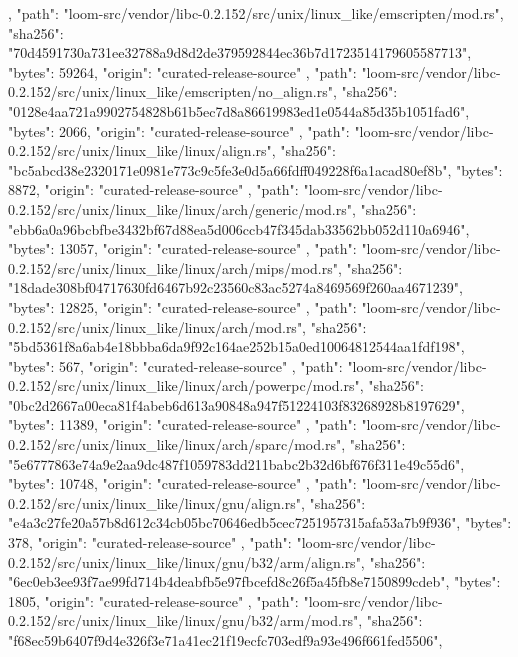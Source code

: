 {{    },
    {
      "path": "loom-src/vendor/libc-0.2.152/src/unix/linux_like/emscripten/mod.rs",
      "sha256": "70d4591730a731ee32788a9d8d2de379592844ec36b7d1723514179605587713",
      "bytes": 59264,
      "origin": "curated-release-source"
    },
    {
      "path": "loom-src/vendor/libc-0.2.152/src/unix/linux_like/emscripten/no_align.rs",
      "sha256": "0128e4aa721a9902754828b61b5ec7d8a86619983ed1e0544a85d35b1051fad6",
      "bytes": 2066,
      "origin": "curated-release-source"
    },
    {
      "path": "loom-src/vendor/libc-0.2.152/src/unix/linux_like/linux/align.rs",
      "sha256": "bc5abcd38e2320171e0981e773c9c5fe3e0d5a66fdff049228f6a1acad80ef8b",
      "bytes": 8872,
      "origin": "curated-release-source"
    },
    {
      "path": "loom-src/vendor/libc-0.2.152/src/unix/linux_like/linux/arch/generic/mod.rs",
      "sha256": "ebb6a0a96bcbfbe3432bf67d88ea5d006ccb47f345dab33562bb052d110a6946",
      "bytes": 13057,
      "origin": "curated-release-source"
    },
    {
      "path": "loom-src/vendor/libc-0.2.152/src/unix/linux_like/linux/arch/mips/mod.rs",
      "sha256": "18dade308bf04717630fd6467b92c23560c83ac5274a8469569f260aa4671239",
      "bytes": 12825,
      "origin": "curated-release-source"
    },
    {
      "path": "loom-src/vendor/libc-0.2.152/src/unix/linux_like/linux/arch/mod.rs",
      "sha256": "5bd5361f8a6ab4e18bbba6da9f92c164ae252b15a0ed10064812544aa1fdf198",
      "bytes": 567,
      "origin": "curated-release-source"
    },
    {
      "path": "loom-src/vendor/libc-0.2.152/src/unix/linux_like/linux/arch/powerpc/mod.rs",
      "sha256": "0bc2d2667a00eca81f4abeb6d613a90848a947f51224103f83268928b8197629",
      "bytes": 11389,
      "origin": "curated-release-source"
    },
    {
      "path": "loom-src/vendor/libc-0.2.152/src/unix/linux_like/linux/arch/sparc/mod.rs",
      "sha256": "5e6777863e74a9e2aa9dc487f1059783dd211babc2b32d6bf676f311e49c55d6",
      "bytes": 10748,
      "origin": "curated-release-source"
    },
    {
      "path": "loom-src/vendor/libc-0.2.152/src/unix/linux_like/linux/gnu/align.rs",
      "sha256": "e4a3c27fe20a57b8d612c34cb05bc70646edb5cec7251957315afa53a7b9f936",
      "bytes": 378,
      "origin": "curated-release-source"
    },
    {
      "path": "loom-src/vendor/libc-0.2.152/src/unix/linux_like/linux/gnu/b32/arm/align.rs",
      "sha256": "6ec0eb3ee93f7ae99fd714b4deabfb5e97fbcefd8c26f5a45fb8e7150899cdeb",
      "bytes": 1805,
      "origin": "curated-release-source"
    },
    {
      "path": "loom-src/vendor/libc-0.2.152/src/unix/linux_like/linux/gnu/b32/arm/mod.rs",
      "sha256": "f68ec59b6407f9d4e326f3e71a41ec21f19ecfc703edf9a93e496f661fed5506",
}}
